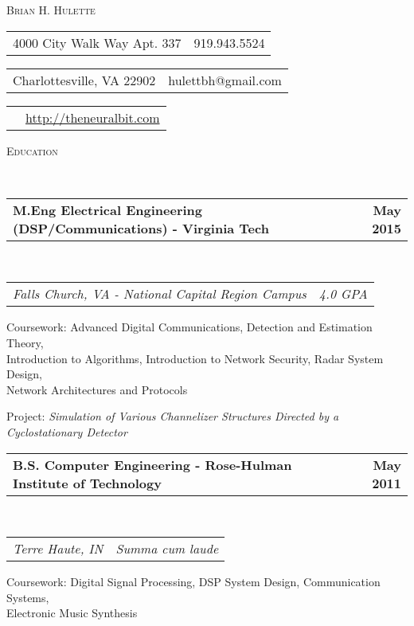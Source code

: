 \documentclass[10pt]{article}
\makeatletter
\newenvironment{changemargin}[2]{%
  \begin{list}{}{%
    \setlength{\topsep}{0pt}%
    \setlength{\leftmargin}{#1}%
    \setlength{\rightmargin}{#2}%
    \setlength{\listparindent}{\parindent}%
    \setlength{\itemindent}{\parindent}%
    \setlength{\parsep}{\parskip}%
  }%
  \item[]}{\end{list}
}
\newcommand{\lineover}{
	\begin{changemargin}{-0.05in}{-0.05in}
		\vspace*{-8pt}
		\hrulefill \\
		\vspace*{-2pt}
	\end{changemargin}
}
\newenvironment{body} {
	\begin{changemargin}{-0.25in}{-0.5in}
  }
	{\end{changemargin}
}
\newenvironment{fullbody} {
	\begin{changemargin}{-0.5in}{-0.5in}
  }
	{\end{changemargin}
}
\newcommand{\headerrule}[1]{
    \vspace*{5pt}
    \begin{changemargin}{-0.5in}{-0.5in}
        \scshape{#1}\\
    \lineover
    \end{changemargin}
}
\newcommand{\headerrow}[2]
{\begin{tabular*}{\linewidth}{@{}l@{\extracolsep{\fill}}r}
	#1 &
	#2 \\
\end{tabular*}}
\makeatother
\begin{document}
\thispagestyle{empty}
\begin{center}
{\LARGE \scshape{Brian H. Hulette}}
\end{center}

\vspace{+1.0em}
\begin{fullbody}
\headerrow
{4000 City Walk Way Apt. 337}
{919.943.5524}

\headerrow
{Charlottesville, VA 22902}
{hulettbh@gmail.com}

\headerrow
{} %
{\url{http://theneuralbit.com}}
\end{fullbody}

\headerrule{Education}
\begin{body}
    \headerrow
        {\textbf{M.Eng Electrical Engineering (DSP/Communications) - Virginia Tech}}
        {\textbf{May 2015}}
    \\
    \headerrow
        {\emph{Falls Church, VA - National Capital Region Campus}}
        {\emph{4.0 GPA}}
    \vspace{-1.7em}

    \begin{description*}
        \item[Coursework:]
        Advanced Digital Communications, Detection and Estimation Theory, \\
        Introduction to Algorithms, Introduction to Network Security, Radar System Design, \\
        Network Architectures and Protocols
        \item[Project:]
            \emph{Simulation of Various Channelizer Structures
                  Directed by a Cyclostationary Detector}
    \end{description*}

    \vspace{+0.5em}

    \headerrow
        {\textbf{B.S. Computer Engineering - Rose-Hulman Institute of Technology}}
        {\textbf{May 2011}}
    \\
    \headerrow
        {\emph{Terre Haute, IN}}
        {\emph{Summa cum laude}}
    \vspace{-1.7em}
    \begin{description*}
        \item[Coursework:]
        Digital Signal Processing, DSP System Design, Communication Systems, \\
        Electronic Music Synthesis
    \end{description*}
\end{body}
\end{document}
